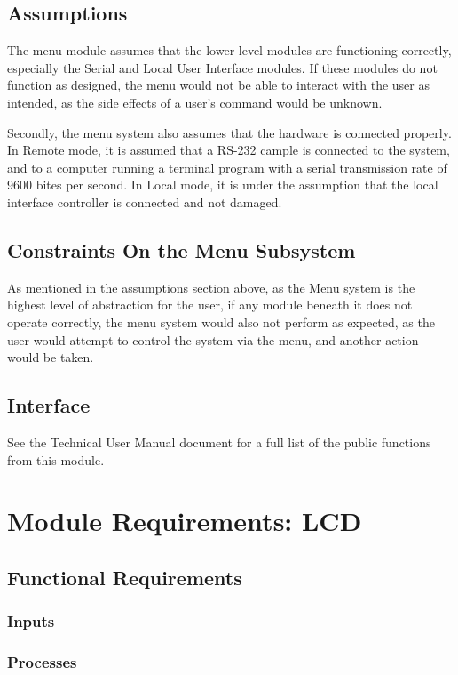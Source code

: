 \documentclass[]{report}
\begin{document}
\subsection{Assumptions}
The menu module assumes that the lower level modules are functioning correctly, especially the Serial and Local User Interface modules. If these modules do not function as designed, the menu would not be able to interact with the user as intended, as the side effects of a user's command would be unknown. 

Secondly, the menu system also assumes that the hardware is connected properly. In Remote mode, it is assumed that a RS-232 cample is connected to the system, and to a computer running a terminal program with a serial transmission rate of 9600 bites per second. In Local mode, it is under the assumption that the local interface controller is connected and not damaged. 

\subsection{Constraints On the Menu Subsystem}
As mentioned in the assumptions section above, as the Menu system is the highest level of abstraction for the user, if any module beneath it does not operate correctly, the menu system would also not perform as expected, as the user would attempt to control the system via the menu, and another action would be taken.

\subsection{Interface}
See the Technical User Manual document for a full list of the public functions from this module.

\section{Module Requirements: LCD}
\subsection{Functional Requirements}
\subsubsection{Inputs}

\subsubsection{Processes}
\end{document}
